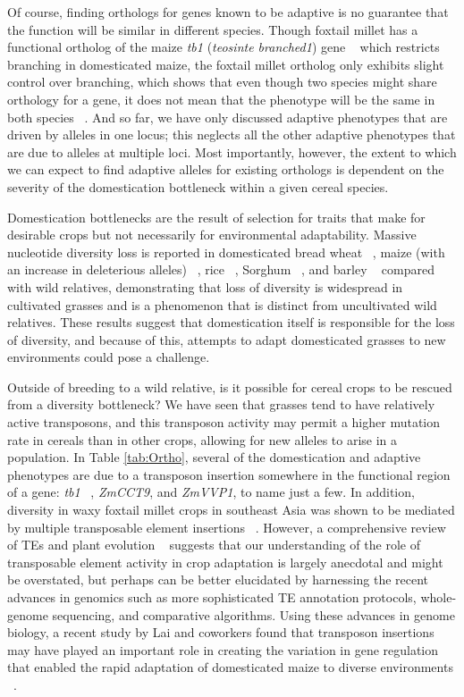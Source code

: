 \documentclass[12pt]{article}
\begin{document}
Of course, finding orthologs for genes known to be adaptive is no guarantee that the function will be similar in different species. Though foxtail millet has a functional ortholog of the maize \textit{tb1} (\textit{teosinte branched1}) gene ~\citep{pmid9087405}  which restricts branching in domesticated maize, the foxtail millet ortholog only exhibits slight control over branching, which shows that even though two species might share orthology for a gene, it does not mean that the phenotype will be the same in both species ~\citep{Doust2004}. And so far, we have only discussed adaptive phenotypes that are driven by alleles in one locus; this neglects all the other adaptive phenotypes that are due to alleles at multiple loci.  Most importantly, however, the extent to which we can expect to find adaptive alleles for existing orthologs is dependent on the severity of the domestication bottleneck within a given cereal species.

Domestication bottlenecks are the result of selection for traits that make for desirable crops but not necessarily for environmental adaptability. Massive nucleotide diversity loss is reported in domesticated bread wheat ~\citep{Haudry2007}, maize (with an increase in deleterious alleles) ~\citep{pmid9539756, Wang2017}, rice ~\citep{pmid17218640}, Sorghum ~\citep{Hamblin2006}, and barley ~\citep{Kilian2006} compared with wild relatives, demonstrating that loss of diversity is widespread in cultivated grasses and is a phenomenon that is distinct from uncultivated wild relatives. These results suggest that domestication itself is responsible for the loss of diversity, and because of this, attempts to adapt domesticated grasses to new environments could pose a challenge.  

Outside of breeding to a wild relative, is it possible for cereal crops to be rescued from a diversity bottleneck? We have seen that grasses tend to have relatively active transposons, and this transposon activity may permit a higher mutation rate in cereals than in other crops, allowing for new alleles to arise in a population.  In Table \ref{tab:Ortho}, several of the domestication and adaptive phenotypes are due to a transposon insertion somewhere in the functional region of a gene: \textit{tb1} ~\citep{Studer2011}, \textit{ZmCCT9}, and \textit{ZmVVP1}, to name just a few. In addition, diversity in waxy foxtail millet crops in southeast Asia was shown to be mediated by multiple transposable element insertions ~\citep{Kawase2005}. However, a comprehensive review of TEs and plant evolution ~\citep{Lisch2001} suggests that our understanding of the role of transposable element activity in crop adaptation is largely anecdotal and might be overstated, but perhaps can be better elucidated by harnessing the recent advances in genomics such as more sophisticated TE annotation protocols, whole-genome sequencing, and comparative algorithms.  Using these advances in genome biology, a recent study by Lai and coworkers found that transposon insertions may have played an important role in creating the variation in gene regulation that enabled the rapid adaptation of domesticated maize to diverse environments ~\citep{Lai2017}. 
\end{document}
